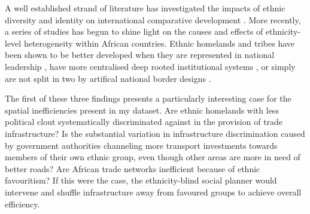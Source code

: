 \documentclass[11pt, oneside]{article}   	%
\begin{document}
A well established strand of literature has investigated the impacts of ethnic diversity and identity on international comparative development \citep{easterly_africas_1997,Alesina_EthnicDiversityEconomic_2005,gennaioli_modern_2007,Alesina_Ethnicinequality_2016}. More recently, a series of studies has begun to shine light on the causes and effects of ethnicity-level heterogeneity within African countries. Ethnic homelands and tribes have been shown to be better developed when they are represented in national leadership \citep{Franck_DoesLeaderEthnicity_2012}, have more centralised deep rooted institutional systems \citep{michalopoulos_pre-colonial_2013}, or simply are not split in two by artifical national border designs \citep{michalopoulos_long-run_2016}.

The first of these three findings presents a particularly interesting case for the spatial inefficiencies present in my dataset. Are ethnic homelands with less political clout systematically discriminated against in the provision of trade infrastructure? Is the substantial variation in infrastructure discrimination caused by government authorities channeling more transport investments towards members of their own ethnic group, even though other areas are more in need of better roads? Are African trade networks inefficient because of ethnic favouritism? If this were the case, the ethnicity-blind social planner would intervene and shuffle infrastructure away from favoured groups to achieve overall efficiency.
\end{document}
